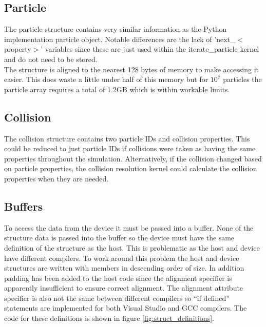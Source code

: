 \documentclass[10pt,a4paper,titlepage]{report}
\begin{document}
\subsection{Particle}
The particle structure contains very similar information as the Python implementation particle object. Notable differences are the lack of 'next\_$<$property$>$' variables since these are just used within the iterate\_particle kernel and do not need to be stored.
\\The structure is aligned to the nearest 128 bytes of memory to make accessing it easier. This does waste a little under half of this memory but for $10^7$ particles the particle array requires a total of 1.2GB which is within workable limits.
\subsection{Collision}
The collision structure contains two particle IDs and collision properties. This could be reduced to just particle IDs if collisions were taken as having the same properties throughout the simulation. Alternatively, if the collision changed based on particle properties, the collision resolution kernel could calculate the collision properties when they are needed.
\subsection{Buffers}
To access the data from the device it must be passed into a buffer. None of the structure data is passed into the buffer so the device must have the same definition of the structure as the host. This is problematic as the host and device have different compilers. To work around this problem the host and device structures are written with members in descending order of size. In addition padding has been added to the host code %
 since the alignment specifier is apparently insufficient to ensure correct alignment. The alignment attribute specifier is also not the same between different compilers so ``if defined'' statements are implemented for both Visual Studio and GCC compilers. The code for these definitions is shown in figure \ref{fig:struct_definitions}.
\end{document}
